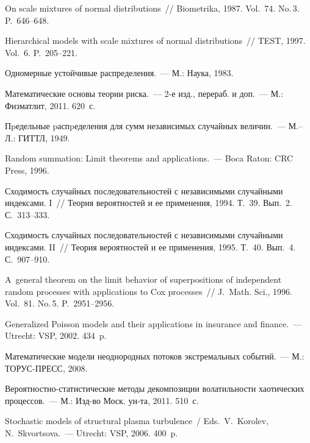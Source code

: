 \begin{multicols}{2}
{{\begin{thebibliography}{99}
On scale mixtures of normal distributions~// Biometrika, 1987. Vol.~74. No.\,3. P.~646--648.

  Hierarchical
models with scale mixtures of normal distributions~// TEST, 1997.
Vol.~6. P.~205--221.

  Одномерные устойчивые
распределения.~--- М.: Наука, 1983.

Математические основы теории риска.~--- 2-е изд., перераб. и доп.~--- М.:
Физматлит, 2011. 620~с.

 Пpедельные
pаспpеделения для сумм независимых случайных величин.~--- М.--Л.: ГИТТЛ, 1949.

 Random summation:
Limit theorems and applications.~--- Boca Raton: CRC Press, 1996.

 Сходимость случайных последовательностей с
независимыми случайными индексами. I~// Теория вероятностей и ее
применения, 1994. Т.~39. Вып.~2. С.~313--333.

 Сходимость случайных последовательностей с независимыми
случайными индексами. II~// Теория вероятностей и ее применения,
1995. Т.~40. Вып.~4. С.~907--910.

 A~general
theorem on the limit behavior of superpositions of independent
random processes with applications to Cox processes~// J.~Math. Sci., 
1996. Vol.~81. No.\,5. P.~2951--2956.

 Generalized Poisson models and their applications in
insurance and finance.~--- Utrecht: VSP, 2002. 434~p.

 Математические модели
неоднородных потоков экстремальных событий.~--- М.: ТОРУС-ПРЕСС, 2008.

 Ве\-ро\-ят\-но\-ст\-но-ста\-ти\-сти\-че\-ские методы
декомпозиции волатильности хаотических процессов.~--- М.: Изд-во
Моск. ун-та, 2011. 510~с.

\label{end\stat}

Stochastic models of structural plasma turbulence~/
Eds.\  V.~Korolev, N.~Skvortsova.~--- Utrecht: VSP, 2006. 400~p.




\end{thebibliography}
}
}


\end{multicols}